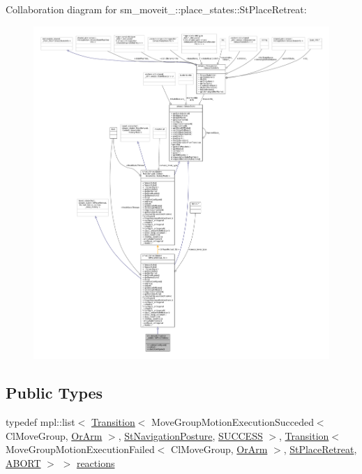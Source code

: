 Collaboration diagram for sm\+\_\+moveit\+\_\+:\+:place\+\_\+states\+:\+:St\+Place\+Retreat\+:
\nopagebreak
\begin{figure}[H]
\begin{center}
\leavevmode
\includegraphics[width=350pt]{structsm__moveit__4_1_1place__states_1_1StPlaceRetreat__coll__graph}
\end{center}
\end{figure}
\subsection*{Public Types}
\begin{DoxyCompactItemize}
\item 
typedef mpl\+::list$<$ \hyperlink{classsmacc_1_1Transition}{Transition}$<$ Move\+Group\+Motion\+Execution\+Succeded$<$ Cl\+Move\+Group, \hyperlink{classsm__moveit__4_1_1OrArm}{Or\+Arm} $>$, \hyperlink{structsm__moveit__4_1_1place__states_1_1StNavigationPosture}{St\+Navigation\+Posture}, \hyperlink{structsmacc_1_1default__transition__tags_1_1SUCCESS}{S\+U\+C\+C\+E\+SS} $>$, \hyperlink{classsmacc_1_1Transition}{Transition}$<$ Move\+Group\+Motion\+Execution\+Failed$<$ Cl\+Move\+Group, \hyperlink{classsm__moveit__4_1_1OrArm}{Or\+Arm} $>$, \hyperlink{structsm__moveit__4_1_1place__states_1_1StPlaceRetreat}{St\+Place\+Retreat}, \hyperlink{structsmacc_1_1default__transition__tags_1_1ABORT}{A\+B\+O\+RT} $>$ $>$ \hyperlink{structsm__moveit__4_1_1place__states_1_1StPlaceRetreat_a137af34354b6135e95217e02aefcc456}{reactions}
\end{DoxyCompactItemize}
